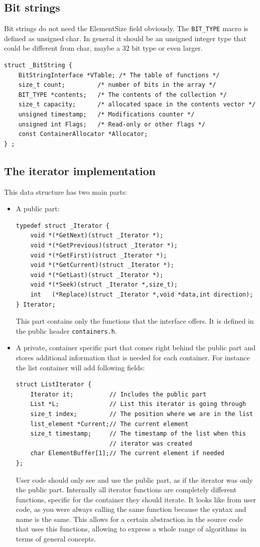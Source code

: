 \documentclass[12pt,a4paper,openany]{memoir} %
\begin{document}
{{\subsection{Bit strings}
Bit strings do not need the ElementSize field obviously. The \verb,BIT_TYPE, macro is defined as unsigned char. In general it should be an
unsigned integer type that could be different from char, maybe a 32 bit type or even larger.
\begin{verbatim}
struct _BitString {
    BitStringInterface *VTable; /* The table of functions */
    size_t count;         /* number of bits in the array */
    BIT_TYPE *contents;   /* The contents of the collection */
    size_t capacity;      /* allocated space in the contents vector */
    unsigned timestamp;   /* Modifications counter */
    unsigned int Flags;   /* Read-only or other flags */
    const ContainerAllocator *Allocator;
} ;
\end{verbatim}

\subsection{The iterator implementation}
This data structure has two main parts:
\begin{itemize}
\item A public part:
\begin{verbatim}
typedef struct _Iterator {
    void *(*GetNext)(struct _Iterator *);
    void *(*GetPrevious)(struct _Iterator *);
    void *(*GetFirst)(struct _Iterator *);
    void *(*GetCurrent)(struct _Iterator *);
    void *(*GetLast)(struct _Iterator *);
    void *(*Seek)(struct _Iterator *,size_t);
    int   (*Replace)(struct _Iterator *,void *data,int direction);
} Iterator;
\end{verbatim} 
This part contains only the functions that the interface offers. It is defined in the public header \verb,containers.h,.
\item A private, container specific part that comes right behind the public part and stores additional information that is needed for each container. 
For instance the list container will add following fields:
\begin{verbatim}
struct ListIterator {
    Iterator it;          // Includes the public part
    List *L;              // List this iterator is going through
    size_t index;         // The position where we are in the list
    list_element *Current;// The current element
    size_t timestamp;     // The timestamp of the list when this
                          // iterator was created
    char ElementBuffer[1];// The current element if needed
};
\end{verbatim}
User code should only see and use the public part, as if the iterator was only the public part. Internally all iterator functions are completely 
different functions, specific for the container they should iterate. It looks like from user code, as you were always calling the same function because 
the syntax and name is the same. This allows for a certain abstraction in the source code that uses this functions, allowing to express a whole range 
of algorithms in terms of general concepts.


\end{itemize}}}
\end{document}
